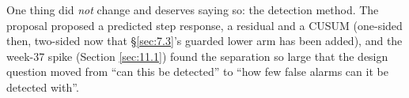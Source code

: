 One thing did \emph{not} change and deserves saying so: the detection method. The proposal
proposed a predicted step response, a residual and a CUSUM (one-sided then, two-sided now that
§\ref{sec:7.3}'s guarded lower arm has been added), and the week-37 spike
(Section \ref{sec:11.1}) found the separation so large that the design question moved from ``can this be
detected'' to ``how few false alarms can it be detected with''.\label{sec:1end}
